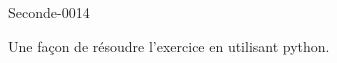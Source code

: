 
\begin{corrige}{Seconde-0014}

    Une façon de résoudre l'exercice en utilisant python.
    

\end{corrige}
